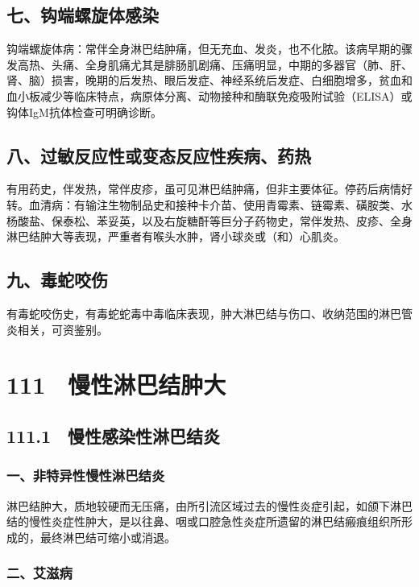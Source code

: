 \subsection{七、钩端螺旋体感染}

钩端螺旋体病：常伴全身淋巴结肿痛，但无充血、发炎，也不化脓。该病早期的骤发高热、头痛、全身肌痛尤其是腓肠肌剧痛、压痛明显，中期的多器官（肺、肝、肾、脑）损害，晚期的后发热、眼后发症、神经系统后发症、白细胞增多，贫血和血小板减少等临床特点，病原体分离、动物接种和酶联免疫吸附试验（ELISA）或钩体IgM抗体检查可明确诊断。

\subsection{八、过敏反应性或变态反应性疾病、药热}

有用药史，伴发热，常伴皮疹，虽可见淋巴结肿痛，但非主要体征。停药后病情好转。血清病：有输注生物制品史和接种卡介苗、使用青霉素、链霉素、磺胺类、水杨酸盐、保泰松、苯妥英，以及右旋糖酐等巨分子药物史，常伴发热、皮疹、全身淋巴结肿大等表现，严重者有喉头水肿，肾小球炎或（和）心肌炎。

\subsection{九、毒蛇咬伤}

有毒蛇咬伤史，有毒蛇蛇毒中毒临床表现，肿大淋巴结与伤口、收纳范围的淋巴管炎相关，可资鉴别。

\protect\hypertarget{text00254.html}{}{}

\section{111　慢性淋巴结肿大}

\subsection{111.1　慢性感染性淋巴结炎}

\subsubsection{一、非特异性慢性淋巴结炎}

淋巴结肿大，质地较硬而无压痛，由所引流区域过去的慢性炎症引起，如颌下淋巴结的慢性炎症性肿大，是以往鼻、咽或口腔急性炎症所遗留的淋巴结瘢痕组织所形成的，最终淋巴结可缩小或消退。

\subsubsection{二、艾滋病}

